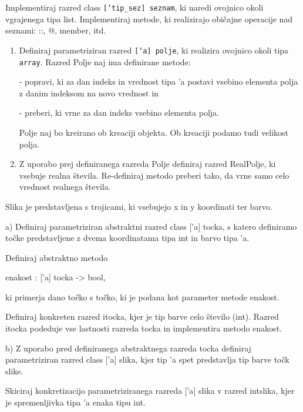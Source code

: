 \begin{ex}
Implementiraj razred class \texttt{['tip\_sez] seznam}, ki naredi ovojnico okoli vgrajenega tipa list. Implementiraj metode, ki realizirajo obi\v cajne operacije nad seznami: ::, @, member, itd.



\end{ex}
\begin{ex}

\begin{enumerate}
\item Definiraj parametriziran razred \texttt{['a] polje}, ki realizira ovojnico okoli tipa \texttt{array}. Razred Polje naj ima definirane metode:

- popravi, ki za dan indeks in vrednost tipa 'a postavi vsebino elementa polja z danim indeksom na novo vrednost in

- preberi, ki vrne za dan indeks vsebino elementa polja. 

Polje naj bo kreirano ob kreaciji objekta. Ob kreaciji podamo tudi velikost polja.

\item Z uporabo prej definiranega razreda Polje definiraj razred RealPolje, ki vsebuje realna \v stevila. Re-definiraj metodo preberi tako, da vrne samo celo vrednost realnega \v stevila.
\end{enumerate}



\end{ex}
\begin{ex}
Slika je predstavljena s trojicami, ki vsebujejo x in y koordinati ter barvo.

a) Definiraj parametriziran abstraktni razred class ['a] tocka, s katero definiramo to\v cke predstavljene z dvema koordinatama tipa int in barvo tipa 'a. 

Definiraj abstraktno metodo 

enakost : ['a] tocka -> bool, 

ki primerja dano to\v cko s to\v cko, ki je podana kot parameter metode enakost. 

Definiraj konkreten razred itocka, kjer je tip barve celo \v stevilo (int). Razred itocka podeduje vse lastnosti razreda tocka in implementira metodo enakost.

b) Z uporabo pred definiranega abstraktnega razreda tocka definiraj parametriziran razred class ['a] slika, kjer tip 'a spet predstavlja tip barve to\v ck slike. 

Skiciraj konkretizacijo parametriziranega razreda ['a] slika v razred intslika, kjer je spremenljivka tipa 'a enaka tipu int.
\end{ex}

